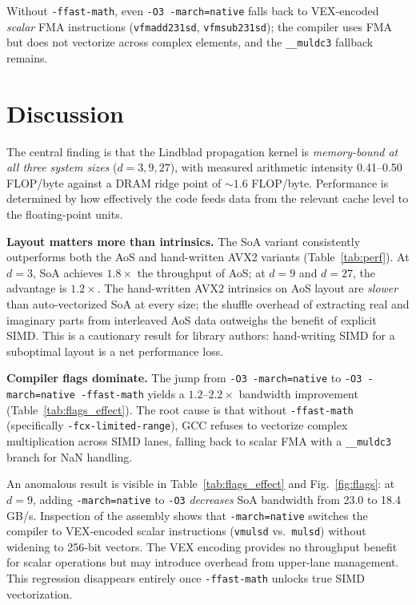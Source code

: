 \documentclass[a4paper,noarxiv]{quantumarticle}
\begin{document}
Without \texttt{-ffast-math}, even \texttt{-O3 -march=native} falls back
to VEX-encoded \emph{scalar} FMA instructions (\texttt{vfmadd231sd},
\texttt{vfmsub231sd}); the compiler uses FMA but does not vectorize
across complex elements, and the \texttt{\_\_muldc3} fallback remains.

\section{Discussion}
\label{sec:discussion}

The central finding is that the Lindblad propagation kernel is
\emph{memory-bound at all three system sizes} ($d = 3, 9, 27$), with
measured arithmetic intensity 0.41--0.50 FLOP/byte against a DRAM ridge
point of ${\sim}1.6$ FLOP/byte. Performance is determined by how
effectively the code feeds data from the relevant cache level to the
floating-point units.

\textbf{Layout matters more than intrinsics.}
The SoA variant consistently outperforms both the AoS and hand-written
AVX2 variants (Table~\ref{tab:perf}). At $d = 3$, SoA achieves
$1.8\times$ the throughput of AoS; at $d = 9$ and $d = 27$, the
advantage is $1.2\times$. The hand-written AVX2 intrinsics on AoS layout
are \emph{slower} than auto-vectorized SoA at every size; the shuffle
overhead of extracting real and imaginary parts from interleaved AoS data
outweighs the benefit of explicit SIMD. This is a cautionary result for
library authors: hand-writing SIMD for a suboptimal layout is a net
performance loss.

\textbf{Compiler flags dominate.}
The jump from \texttt{-O3 -march=native} to \texttt{-O3 -march=native
-ffast-math} yields a $1.2$--$2.2\times$ bandwidth improvement
(Table~\ref{tab:flags_effect}). The root cause is that without
\texttt{-ffast-math} (specifically \texttt{-fcx-limited-range}), GCC
refuses to vectorize complex multiplication across SIMD lanes, falling
back to scalar FMA with a \texttt{\_\_muldc3} branch for NaN handling.

An anomalous result is visible in Table~\ref{tab:flags_effect} and
Fig.~\ref{fig:flags}: at $d = 9$, adding \texttt{-march=native} to
\texttt{-O3} \emph{decreases} SoA bandwidth from 23.0 to 18.4\,GB/s.
Inspection of the assembly shows that \texttt{-march=native} switches the
compiler to VEX-encoded scalar instructions (\texttt{vmulsd} vs.\
\texttt{mulsd}) without widening to 256-bit vectors. The VEX encoding
provides no throughput benefit for scalar operations but may introduce
overhead from upper-lane management. This regression disappears entirely
once \texttt{-ffast-math} unlocks true SIMD vectorization.
\end{document}
